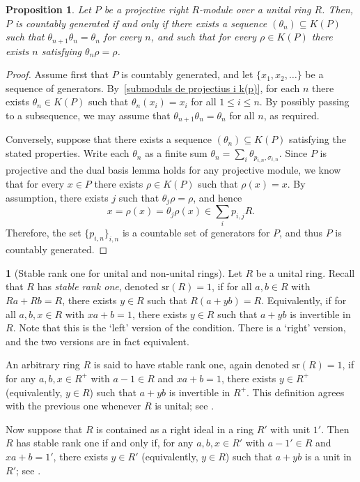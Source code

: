 \documentclass[11pt]{amsart}
\numberwithin{equation}{section}
\newtheorem{prp}[prpCt]{Proposition}
\theoremstyle{definition}
\newtheorem{pgr}[pgrCt]{}
\theoremstyle{plain}
\theoremstyle{definition}
\begin{document}
\begin{prp}
Let $P$ be a projective right $R$-module over a unital ring $R$. Then, $P$ is countably generated if and only if there exists a sequence $(\theta_n) \subseteq K(P)$ such that $\theta_{n+1}\theta_n = \theta_n$ for every $n$, and such that for every $ \rho \in K(P)$ there exists $n$ satisfying $\theta_n\rho = \rho$. 
\end{prp}

\begin{proof}
Assume first that $P$ is countably generated, and let $\{x_1,x_2,\dots\}$ be a sequence of generators. By~\autoref{submoduls de projectius i k(p)}, for each $n$ there exists $\theta_n \in K(P)$ such that $\theta_n(x_i)=x_i$ for all $1 \le i \le n$. By possibly passing to a subsequence, we may assume that $\theta_{n+1}\theta_n=\theta_n$ for all $n$, as required. 

Conversely, suppose that there exists a sequence $(\theta_n) \subseteq K(P)$ satisfying the stated properties. Write each $\theta_n$ as a finite sum $\theta_n = \sum_i \theta_{p_{i,n},\sigma_{i,n}}$. Since $P$ is projective and the dual basis lemma holds for any projective module, we know that for every $x \in P$ there exists $\rho \in K(P)$ such that $\rho(x)=x$. By assumption, there exists $j$ such that $\theta_j \rho = \rho$, and hence
\[
x = \rho(x) = \theta_j \rho(x) \in \sum_i p_{i,j}R.
\]
Therefore, the set $\{p_{i,n}\}_{i,n}$ is a countable set of generators for $P$, and thus $P$ is countably generated.
\end{proof}

\begin{pgr}[Stable rank one for unital and non-unital rings] \label{def stable rank one}
Let $R$ be a unital ring. Recall that $R$ has \emph{stable rank one}, denoted $\mathrm{sr}(R)=1$, if for all $a,b \in R$ with $Ra + Rb = R$, there exists $y \in R$ such that $R(a + yb) = R$. Equivalently, if for all $a, b, x \in R$ with $xa + b = 1$, there exists $y \in R$ such that $a + yb$ is invertible in $R$. Note that this is the `left' version of the condition. There is a `right' version, and the two versions are in fact equivalent. 

An arbitrary ring $R$ is said to have stable rank one, again denoted $\mathrm{sr}(R) = 1$, if for any $a, b, x \in R^+$ with $a - 1 \in R$ and $xa + b = 1$, there exists $y \in R^+$ (equivalently, $y \in R$) such that $a + yb$ is invertible in $R^+$. This definition agrees with the previous one whenever $R$ is unital; see \cite[Theorem 3.4]{Vaserstein84StRangeCond}. 

Now suppose that $R$ is contained as a right ideal in a ring $R'$ with unit $1'$. Then $R$ has stable rank one if and only if, for any $a, b, x \in R'$ with $a - 1' \in R$ and $xa + b = 1'$, there exists $y \in R'$ (equivalently, $y \in R$) such that $a + yb$ is a unit in $R'$; see \cite[Lemma 3.5, Theorem 3.6]{Vaserstein84StRangeCond}.
\end{pgr}
\end{document}
